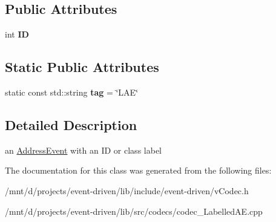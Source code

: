 \subsection*{Public Attributes}
\begin{DoxyCompactItemize}
\item 
\mbox{\label{classev_1_1LabelledAE_a59a295976cdf867006deea22d7cf1942}} 
int {\bfseries ID}
\end{DoxyCompactItemize}
\subsection*{Static Public Attributes}
\begin{DoxyCompactItemize}
\item 
\mbox{\label{classev_1_1LabelledAE_a825f9f0819046248ce7f6d0af4871cec}} 
static const std\+::string {\bfseries tag} = \char`\"{}L\+AE\char`\"{}
\end{DoxyCompactItemize}


\subsection{Detailed Description}
an \hyperlink{classev_1_1AddressEvent}{Address\+Event} with an ID or class label 

The documentation for this class was generated from the following files\+:\begin{DoxyCompactItemize}
\item 
/mnt/d/projects/event-\/driven/lib/include/event-\/driven/v\+Codec.\+h\item 
/mnt/d/projects/event-\/driven/lib/src/codecs/codec\+\_\+\+Labelled\+A\+E.\+cpp\end{DoxyCompactItemize}

